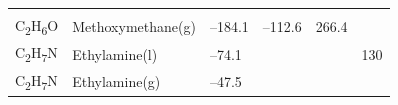 \documentclass[
]{book}
\theoremstyle{definition}
\theoremstyle{definition}
\theoremstyle{definition}
\theoremstyle{remark}
\begin{document}
\begin{longtable}[]{@{}llllll@{}}
\begin{minipage}[t]{0.14\columnwidth}
\strut
\end{minipage}\tabularnewline
\begin{minipage}[t]{0.07\columnwidth}\raggedright
C\textsubscript{2}H\textsubscript{6}O\strut
\end{minipage} & \begin{minipage}[t]{0.17\columnwidth}\raggedright
Methoxymethane(g)\strut
\end{minipage} & \begin{minipage}[t]{0.15\columnwidth}\raggedright
--184.1\strut
\end{minipage} & \begin{minipage}[t]{0.15\columnwidth}\raggedright
--112.6\strut
\end{minipage} & \begin{minipage}[t]{0.14\columnwidth}\raggedright
266.4\strut
\end{minipage} & \begin{minipage}[t]{0.14\columnwidth}\raggedright
\strut
\end{minipage}\tabularnewline
\begin{minipage}[t]{0.07\columnwidth}\raggedright
C\textsubscript{2}H\textsubscript{7}N\strut
\end{minipage} & \begin{minipage}[t]{0.17\columnwidth}\raggedright
Ethylamine(l)\strut
\end{minipage} & \begin{minipage}[t]{0.15\columnwidth}\raggedright
--74.1\strut
\end{minipage} & \begin{minipage}[t]{0.15\columnwidth}\raggedright
\strut
\end{minipage} & \begin{minipage}[t]{0.14\columnwidth}\raggedright
\strut
\end{minipage} & \begin{minipage}[t]{0.14\columnwidth}\raggedright
130\strut
\end{minipage}\tabularnewline
\begin{minipage}[t]{0.07\columnwidth}\raggedright
C\textsubscript{2}H\textsubscript{7}N\strut
\end{minipage} & \begin{minipage}[t]{0.17\columnwidth}\raggedright
Ethylamine(g)\strut
\end{minipage} & \begin{minipage}[t]{0.15\columnwidth}\raggedright
--47.5\strut
\end{minipage} & \begin{minipage}[t]{0.15\columnwidth}\raggedright

\end{minipage}
\end{longtable}
\end{document}
